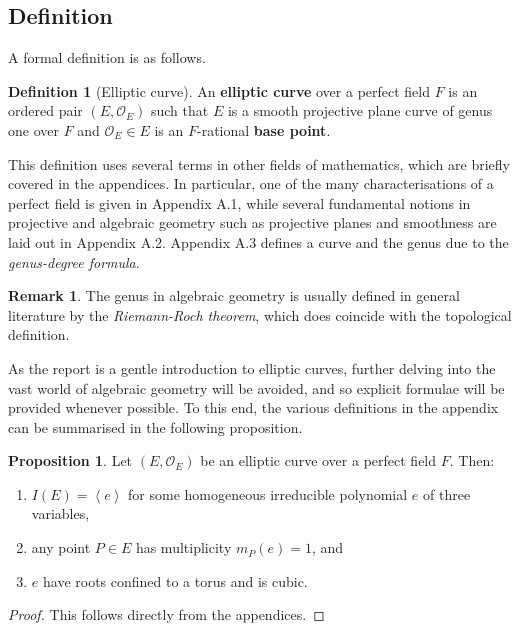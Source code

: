 \documentclass{article}
\newcommand{\rb}[1]{\left( #1 \right)}
\newcommand{\ab}[1]{\left\langle #1 \right\rangle}
\theoremstyle{definition}
\newtheorem*{definition}{Definition}
\newtheorem*{remark}{Remark}
\newtheorem{proposition}{Proposition}[subsection]
\begin{document}
\subsection{Definition}

A formal definition is as follows.

\begin{definition}[Elliptic curve]
An \textbf{elliptic curve} over a perfect field $ F $ is an ordered pair $ \rb{E, \mathcal{O}_E} $ such that $ E $ is a smooth projective plane curve of genus one over $ F $ and $ \mathcal{O}_E \in E $ is an $ F $-rational \textbf{base point}.
\end{definition}

This definition uses several terms in other fields of mathematics, which are briefly covered in the appendices. In particular, one of the many characterisations of a perfect field is given in Appendix A.1, while several fundamental notions in projective and algebraic geometry such as projective planes and smoothness are laid out in Appendix A.2. Appendix A.3 defines a curve and the genus due to the \emph{genus-degree formula}.

\begin{remark}
The genus in algebraic geometry is usually defined in general literature by the \emph{Riemann-Roch theorem}, which does coincide with the topological definition.
\end{remark}

As the report is a gentle introduction to elliptic curves, further delving into the vast world of algebraic geometry will be avoided, and so explicit formulae will be provided whenever possible. To this end, the various definitions in the appendix can be summarised in the following proposition.

\begin{proposition}
\label{prop:appendices}
Let $ \rb{E, \mathcal{O}_E} $ be an elliptic curve over a perfect field $ F $. Then:
\begin{enumerate}
\item $ I\rb{E} = \ab{e} $ for some homogeneous irreducible polynomial $ e $ of three variables,
\item any point $ P \in E $ has multiplicity $ m_P\rb{e} = 1 $, and
\item $ e $ have roots confined to a torus and is cubic.
\end{enumerate}
\end{proposition}

\begin{proof}
This follows directly from the appendices.
\end{proof}
\end{document}
